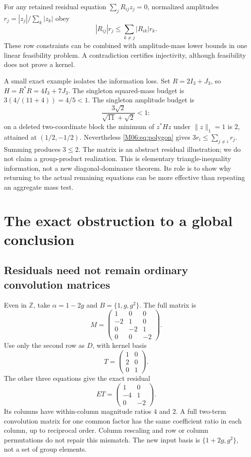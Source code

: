 \documentclass[11pt,a4paper,oneside]{report}
\theoremstyle{definition}
\theoremstyle{remark}
\newcommand{\Z}{\mathbb Z}
\begin{document}
For any retained residual equation
$\sum_j R_{ij}z_j=0$, normalized amplitudes
$r_j=|z_j|/\sum_k|z_k|$ obey
\begin{equation}\label{M06:eq:polygon}
|R_{ij}|r_j\le\sum_{k\ne j}|R_{ik}|r_k.
\end{equation}
These row constraints can be combined with amplitude-mass lower bounds
in one linear feasibility problem. A contradiction certifies
injectivity, although feasibility does not prove a kernel.

A small exact example isolates the information loss. Set
$R=2I_3+J_3$, so $H=R^*R=4I_3+7J_3$.
The singleton squared-mass budget is $3(4/(11+4))=4/5<1$.
The singleton amplitude budget is
\[
\frac{3\sqrt2}{\sqrt{11}+\sqrt2}<1:
\]
on a deleted two-coordinate block the minimum of $z^*Hz$
under $\|z\|_1=1$ is $2$, attained at $(1/2,-1/2)$.
Nevertheless \eqref{M06:eq:polygon} gives
$3r_i\le\sum_{j\ne i}r_j$. Summing produces $3\le2$.
The matrix is an abstract residual illustration; we do not
claim a group-product realization. This is elementary
triangle-inequality information, not a new diagonal-dominance
theorem. Its role is to show why returning to the actual
remaining equations can be more effective than repeating an
aggregate mass test.

\section{The exact obstruction to a global conclusion}\label{M06:sec:limits}

\subsection{Residuals need not remain ordinary convolution matrices}

Even in $\Z$, take $\alpha=1-2g$ and
$B=\{1,g,g^2\}$. The full matrix is
\[
M=\begin{pmatrix}1&0&0\\-2&1&0\\0&-2&1\\0&0&-2\end{pmatrix}.
\]
Use only the second row as $D$, with kernel basis
\[
T=\begin{pmatrix}1&0\\2&0\\0&1\end{pmatrix}.
\]
The other three equations give the exact residual
\[
ET=\begin{pmatrix}1&0\\-4&1\\0&-2\end{pmatrix}.
\]
Its columns have within-column magnitude ratios $4$ and $2$.
A full two-term convolution matrix for one common factor
has the same coefficient ratio in each column, up to reciprocal
order. Column rescaling and row or column permutations do
not repair this mismatch. The new input basis is
$\{1+2g,g^2\}$, not a set of group elements.
\end{document}
